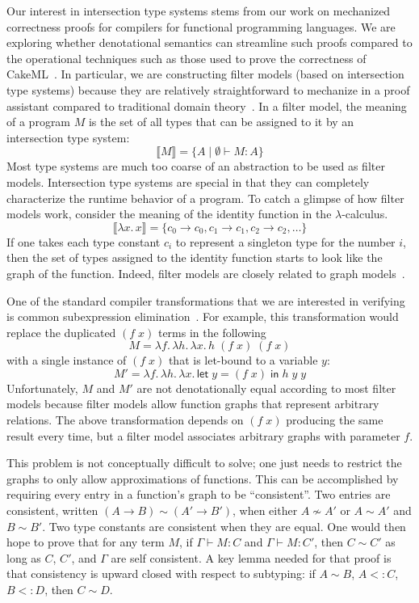 \documentclass{article}
\begin{document}
Our interest in intersection type systems stems from our work on
mechanized correctness proofs for compilers for functional programming
languages. We are exploring whether denotational semantics can
streamline such proofs compared to the operational techniques such as
those used to prove the correctness of
CakeML~\citep{Kumar:2014aa,Owens:2017aa}. In particular, we are
constructing filter models (based on intersection type systems)
because they are relatively straightforward to mechanize in a proof
assistant compared to traditional domain
theory~\citep{Benton:2009ab,Dockins:2014aa}.  In a filter model, the
meaning of a program $M$ is the set of all types that can be assigned
to it by an intersection type system:
\[
   \llbracket M \rrbracket = \{ A \mid \emptyset \vdash M : A \}
\]
Most type systems are much too coarse of an abstraction to be used as
filter models. Intersection type systems are special in that they can
completely characterize the runtime behavior of a program.  To catch a
glimpse of how filter models work, consider the meaning of the
identity function in the $\lambda$-calculus.
\[
  \llbracket \lambda x.\, x \rrbracket =
      \{ c_0 \to c_0, c_1 \to c_1, c_2 \to c_2, \ldots \}
\]
If one takes each type constant $c_i$ to represent a singleton type
for the number $i$, then the set of types assigned to the identity
function starts to look like the graph of the function. Indeed, filter
models are closely related to graph
models~\citep{Scott:1976lq,Engeler:1981aa,Plotkin:1993ab,Barendregt:2013aa}.

One of the standard compiler transformations that we are interested in
verifying is common subexpression
elimination~\citep{Downey:JACM:1980,Appel:1992fk,Tarditi:1996aa}. For
example, this transformation would replace the duplicated $(f \; x)$
terms in the following
\[
  M = \lambda f.\, \lambda h.\, \lambda x.\, h \; (f \; x) \; (f \; x)
\]
with a single instance of $(f\;x)$ that is let-bound to a variable $y$:
\[
M' = \lambda f.\, \lambda h.\, \lambda x.\,
\mathsf{let}\; y = (f \; x) \;\mathsf{in}\;
h \; y \; y
\]
Unfortunately, $M$ and $M'$ are not denotationally equal according to
most filter models because filter models allow function graphs that
represent arbitrary relations. The above transformation depends on $(f
\; x)$ producing the same result every time, but a filter model
associates arbitrary graphs with parameter $f$.

This problem is not conceptually difficult to solve; one just needs to
restrict the graphs to only allow approximations of functions. This
can be accomplished by requiring every entry in a function's graph to
be ``consistent''. Two entries are consistent, written $(A \to B) \sim
(A' \to B')$, when either $A \not\sim A'$ or $A \sim A'$ and $B \sim
B'$. Two type constants are consistent when they are equal. One would
then hope to prove that for any term $M$, if $\Gamma \vdash M : C$ and
$\Gamma \vdash M : C'$, then $C \sim C'$ as long as $C$, $C'$, and
$\Gamma$ are self consistent. A key lemma needed for that proof is
that consistency is upward closed with respect to subtyping: if $A
\sim B$, $A <: C$, $B <: D$, then $C \sim D$.
\end{document}
